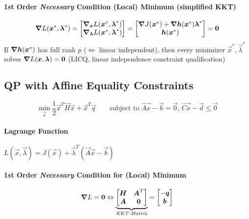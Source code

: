 \paragraph{1st Order \emph{Necessary} Condition (Local) Minimum (simplified KKT)} 
\begin{equation*}
\grad L(\vec x^\ast, \vec \lambda^\ast) = 
\begin{bmatrix}
\grad_{\vec x} L(\vec x^\ast, \vec \lambda^\ast) \\
\grad_{\vec \lambda} L(\vec x^\ast, \vec \lambda^\ast)
\end{bmatrix} =
\begin{bmatrix}
\grad J(\vec x^\ast) + \grad \vec h(\vec x^\ast)\vec \lambda^\ast \\
\vec h(\vec x^\ast)
\end{bmatrix}
= \vec 0
\end{equation*}
If $\grad \vec h(\vec x^\ast)$ has full rank $p$ ($\Leftrightarrow$ linear independent), then every minimizer $\vec x^\ast, \vec \lambda^\ast$ solves $\grad L(\vec x, \vec \lambda) = \vec 0$ (LICQ, linear independence constraint qualification)

\subsection{QP with Affine Equality Constraints}
\begin{equation*}
\boxed{\min_{\vec x} \frac{1}{2} \vec x^T \vec H \vec x + \vec x^T \vec q\qquad \text{subject to } \vec{Ax} - \vec{b} = \vec 0, \, \vec{Cx} - \vec d \leq \vec 0}
\end{equation*}

\paragraph{Lagrange Function} $L(\vec x, \vec \lambda) = J(\vec x) + \vec \lambda^T(\vec A \vec x - \vec b)$

\paragraph{1st Order \emph{Necessary} Condition for (Local) Minimum}
\begin{equation*}
\grad L = \vec 0 \Leftrightarrow 
\underbrace{\begin{bmatrix}
	\vec H &\vec A^T \\
	\vec A & \vec 0
	\end{bmatrix}}_{\text{\emph{KKT-Matrix}}}
= 
\begin{bmatrix}
-\vec q \\
\vec b
\end{bmatrix}
\end{equation*}

